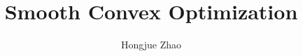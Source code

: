 \documentclass{article}
\title{Smooth Convex Optimization}
\author{Hongjue Zhao}
\date{}
\begin{document}
    \maketitle
    {
        
    }
\end{document}
